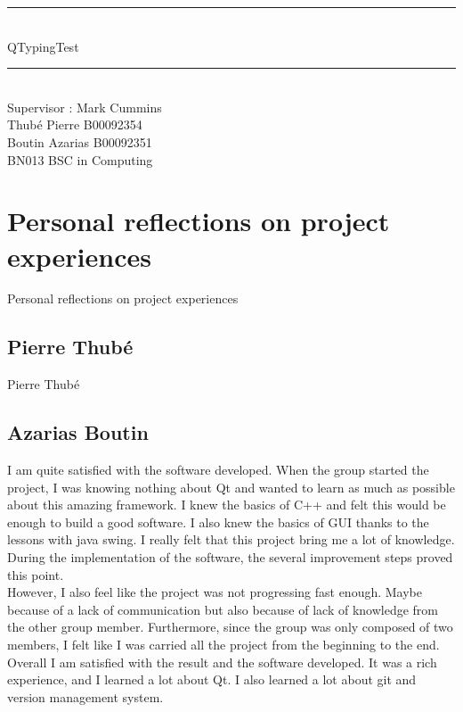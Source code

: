 \documentclass[12pt]{report}
\newcommand{\Mline}{\hrule \mbox{}\\[0.1cm]}
\begin{document}
\begin{titlepage}
\begin{center}


\Mline
{ \LARGE QTypingTest \\[0.4cm] }
\Mline

\textsf{Supervisor : Mark Cummins}\\[3cm]

\textsf{Thubé Pierre B00092354\\
	Boutin Azarias B00092351\\[2cm]
	BN013 BSC in Computing}

\end{center}
\end{titlepage}

\setcounter{page}{2}

\tableofcontents







\part{Personal reflections on project experiences}
Personal reflections on project experiences

\chapter{Pierre Thubé}
Pierre Thubé

\chapter{Azarias Boutin}
I am quite satisfied with the software developed. When the group started the project, I was knowing nothing about Qt and wanted to learn as much as possible about this amazing framework. I knew the basics of C++ and felt this would be enough to build a good software. I also knew the basics of GUI thanks to the lessons with java swing. I really felt that this project bring me a lot of knowledge. During the implementation of the software, the several improvement steps proved this point.\\
However, I also feel like the project was not progressing fast enough. Maybe because of a lack of communication but also because of lack of knowledge from the other group member. Furthermore, since the group was only composed of two members, I felt like I was carried all the project from the beginning to the end.\\
Overall I am satisfied with the result and the software developed. It was a rich experience, and I learned a lot about Qt. I also learned a lot about git and version management system.
\end{document}
